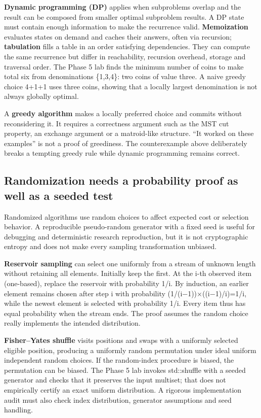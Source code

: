 \textbf{Dynamic programming (DP)} applies when subproblems overlap and the result can be composed from smaller optimal subproblem results. A DP state must contain enough information to make the recurrence valid. \textbf{Memoization} evaluates states on demand and caches their answers, often via recursion; \textbf{tabulation} fills a table in an order satisfying dependencies. They can compute the same recurrence but differ in reachability, recursion overhead, storage and traversal order. The Phase 5 lab finds the minimum number of coins to make total six from denominations \{1,3,4\}: two coins of value three. A naive greedy choice 4+1+1 uses three coins, showing that a locally largest denomination is not always globally optimal.

A \textbf{greedy algorithm} makes a locally preferred choice and commits without reconsidering it. It requires a correctness argument such as the MST cut property, an exchange argument or a matroid-like structure. ``It worked on these examples'' is not a proof of greediness. The counterexample above deliberately breaks a tempting greedy rule while dynamic programming remains correct.

\subsection{Randomization needs a probability proof as well as a seeded test}\label{05-engine-i-ch008-randomization-needs-a-probability-proof-as-well-as-a-seeded-test}

Randomized algorithms use random choices to affect expected cost or selection behavior. A reproducible pseudo-random generator with a fixed seed is useful for debugging and deterministic research reproduction, but it is not cryptographic entropy and does not make every sampling transformation unbiased.

\textbf{Reservoir sampling} can select one uniformly from a stream of unknown length without retaining all elements. Initially keep the first. At the i-th observed item (one-based), replace the reservoir with probability 1/i. By induction, an earlier element remains chosen after step i with probability (1/(i−1))×((i−1)/i)=1/i, while the newest element is selected with probability 1/i. Every item thus has equal probability when the stream ends. The proof assumes the random choice really implements the intended distribution.

\textbf{Fisher--Yates shuffle} visits positions and swaps with a uniformly selected eligible position, producing a uniformly random permutation under ideal uniform independent random choices. If the random-index procedure is biased, the permutation can be biased. The Phase 5 lab invokes std::shuffle with a seeded generator and checks that it preserves the input multiset; that does not empirically certify an exact uniform distribution. A rigorous implementation audit must also check index distribution, generator assumptions and seed handling.

